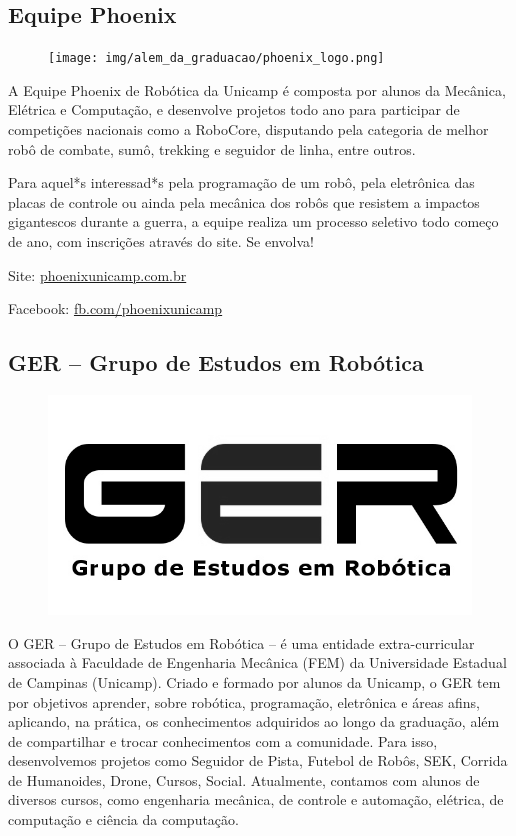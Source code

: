 \subsection{Equipe Phoenix}

\begin{figure}[h!]
  \centering
  \texttt{[image: img/alem\_da\_graduacao/phoenix\_logo.png]}
\end{figure}

A Equipe Phoenix de Robótica da Unicamp é composta por alunos da Mecânica,
Elétrica e Computação, e desenvolve projetos todo ano para participar de
competições nacionais como a RoboCore, disputando pela categoria de melhor robô
de combate, sumô, trekking e seguidor de linha, entre outros.

Para aquel*s interessad*s pela programação de um robô, pela eletrônica das
placas de controle ou ainda pela mecânica dos robôs que resistem a impactos
gigantescos durante a guerra, a equipe realiza um processo seletivo todo começo
de ano, com inscrições através do site. Se envolva!

\begin{compactitemize}
\item Site: \url{phoenixunicamp.com.br}
\item Facebook: \url{fb.com/phoenixunicamp}
\end{compactitemize}

\subsection{GER -- Grupo de Estudos em Robótica}

\begin{figure}[h!]
    \centering
    \includegraphics[width=.35\textwidth]{img/alem_da_graduacao/ger_logo.jpg}
\end{figure}

O GER – Grupo de Estudos em Robótica – é uma entidade extra-curricular
associada à Faculdade de Engenharia Mecânica (FEM) da Universidade Estadual
de Campinas (Unicamp). Criado e formado por alunos da Unicamp, o GER tem por
objetivos aprender, sobre robótica, programação, eletrônica e áreas afins,
aplicando, na prática, os conhecimentos adquiridos ao longo da graduação,
além de compartilhar e trocar conhecimentos com a comunidade. Para isso,
desenvolvemos projetos como Seguidor de Pista, Futebol de Robôs, SEK, Corrida
de Humanoides, Drone, Cursos, Social. Atualmente, contamos com alunos de
diversos cursos, como engenharia mecânica, de controle e automação, elétrica,
de computação e ciência da computação.

